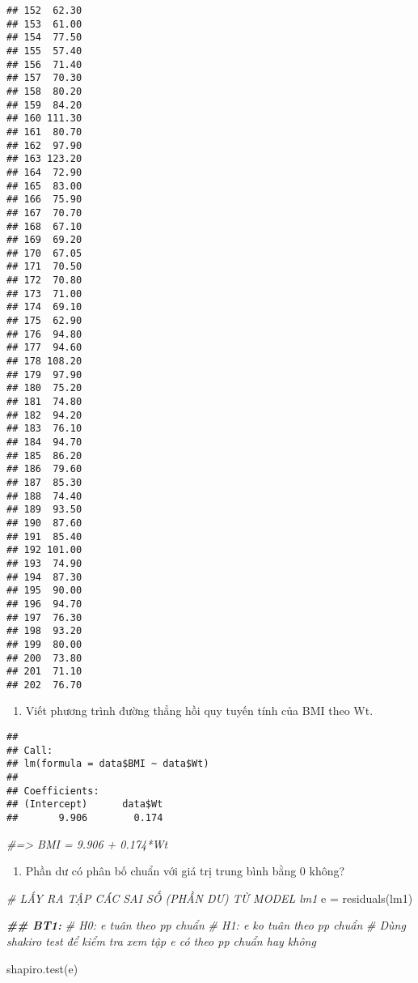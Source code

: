 \documentclass[
]{article}
\newenvironment{Shaded}{\begin{snugshade}}{\end{snugshade}}
\newcommand{\CommentTok}[1]{\textcolor[rgb]{0.56,0.35,0.01}{\textit{#1}}}
\newcommand{\DocumentationTok}[1]{\textcolor[rgb]{0.56,0.35,0.01}{\textbf{\textit{#1}}}}
\newcommand{\FunctionTok}[1]{\textcolor[rgb]{0.00,0.00,0.00}{#1}}
\newcommand{\NormalTok}[1]{#1}
\newcommand{\OtherTok}[1]{\textcolor[rgb]{0.56,0.35,0.01}{#1}}
\newcommand{\SpecialCharTok}[1]{\textcolor[rgb]{0.00,0.00,0.00}{#1}}
\providecommand{\tightlist}{%
  \setlength{\itemsep}{0pt}\setlength{\parskip}{0pt}}
\begin{document}
\begin{verbatim}
## 152  62.30
## 153  61.00
## 154  77.50
## 155  57.40
## 156  71.40
## 157  70.30
## 158  80.20
## 159  84.20
## 160 111.30
## 161  80.70
## 162  97.90
## 163 123.20
## 164  72.90
## 165  83.00
## 166  75.90
## 167  70.70
## 168  67.10
## 169  69.20
## 170  67.05
## 171  70.50
## 172  70.80
## 173  71.00
## 174  69.10
## 175  62.90
## 176  94.80
## 177  94.60
## 178 108.20
## 179  97.90
## 180  75.20
## 181  74.80
## 182  94.20
## 183  76.10
## 184  94.70
## 185  86.20
## 186  79.60
## 187  85.30
## 188  74.40
## 189  93.50
## 190  87.60
## 191  85.40
## 192 101.00
## 193  74.90
## 194  87.30
## 195  90.00
## 196  94.70
## 197  76.30
## 198  93.20
## 199  80.00
## 200  73.80
## 201  71.10
## 202  76.70
\end{verbatim}

\begin{enumerate}
\def\labelenumi{\alph{enumi}.}
\tightlist
\item
  Viết phương trình đường thẳng hồi quy tuyến tính của BMI theo Wt.
\end{enumerate}

\begin{Shaded}
\end{Shaded}

\begin{verbatim}
## 
## Call:
## lm(formula = data$BMI ~ data$Wt)
## 
## Coefficients:
## (Intercept)      data$Wt  
##       9.906        0.174
\end{verbatim}

\begin{Shaded}
\begin{Highlighting}[]
\CommentTok{\#=\textgreater{} BMI = 9.906 + 0.174*Wt}
\end{Highlighting}
\end{Shaded}

\begin{enumerate}
\def\labelenumi{\alph{enumi}.}
\setcounter{enumi}{1}
\tightlist
\item
  Phần dư có phân bố chuẩn với giá trị trung bình bằng 0 không?
\end{enumerate}

\begin{Shaded}
\begin{Highlighting}[]
\CommentTok{\# LẤY RA TẬP CÁC SAI SỐ (PHẦN DƯ) TỪ MODEL lm1}
\NormalTok{e }\OtherTok{=} \FunctionTok{residuals}\NormalTok{(lm1)}

\DocumentationTok{\#\# BT1: }
\CommentTok{\#     H0: e tuân theo pp chuẩn}
\CommentTok{\#     H1: e ko tuân theo pp chuẩn}
\CommentTok{\#   Dùng shakiro test để kiểm tra xem tập e có theo pp chuẩn hay không}

\FunctionTok{shapiro.test}\NormalTok{(e)}
\end{Highlighting}
\end{Shaded}
\end{document}
